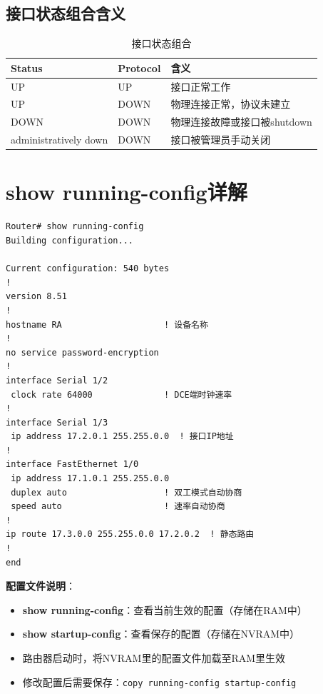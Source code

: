 \documentclass[12pt,a4paper]{ctexart}
\begin{document}
\subsection{接口状态组合含义}

\begin{table}[htbp]
\centering
\begin{tabular}{lll}
\toprule
\textbf{Status} & \textbf{Protocol} & \textbf{含义} \\
\midrule
UP & UP & 接口正常工作 \\
UP & DOWN & 物理连接正常，协议未建立 \\
DOWN & DOWN & 物理连接故障或接口被shutdown \\
administratively down & DOWN & 接口被管理员手动关闭 \\
\bottomrule
\end{tabular}
\caption{接口状态组合}
\end{table}

\section{show running-config详解}

\begin{cmdbox}
\begin{lstlisting}
Router# show running-config
Building configuration...

Current configuration: 540 bytes
!
version 8.51
!
hostname RA                    ! 设备名称
!
no service password-encryption
!
interface Serial 1/2
 clock rate 64000              ! DCE端时钟速率
!
interface Serial 1/3
 ip address 17.2.0.1 255.255.0.0  ! 接口IP地址
!
interface FastEthernet 1/0
 ip address 17.1.0.1 255.255.0.0
 duplex auto                   ! 双工模式自动协商
 speed auto                    ! 速率自动协商
!
ip route 17.3.0.0 255.255.0.0 17.2.0.2  ! 静态路由
!
end
\end{lstlisting}
\end{cmdbox}

\begin{keybox}
\textbf{配置文件说明}：
\begin{itemize}[itemsep=0pt]
    \item \textbf{show running-config}：查看当前生效的配置（存储在RAM中）
    \item \textbf{show startup-config}：查看保存的配置（存储在NVRAM中）
    \item 路由器启动时，将NVRAM里的配置文件加载至RAM里生效
    \item 修改配置后需要保存：\texttt{copy running-config startup-config}
\end{itemize}
\end{keybox}
\end{document}
